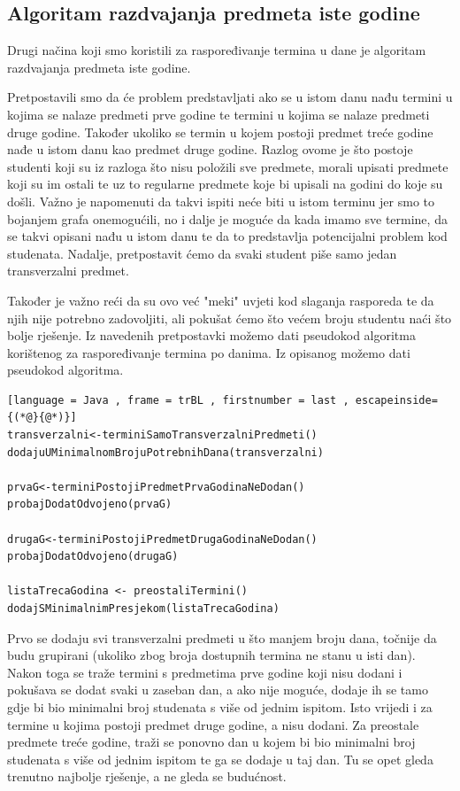 \documentclass[times, utf8, zavrsni, numeric]{fer}
\begin{document}
\subsection*{Algoritam razdvajanja predmeta iste godine}
Drugi načina koji smo koristili za raspoređivanje termina u dane je algoritam razdvajanja predmeta iste godine.\par
Pretpostavili smo da će problem predstavljati ako se u istom danu nađu termini u kojima se nalaze predmeti prve godine te termini u kojima se nalaze predmeti druge godine. Također ukoliko se termin u kojem postoji predmet treće godine nađe u istom danu kao predmet druge godine. Razlog ovome je što postoje studenti koji su iz razloga što nisu položili sve predmete, morali upisati predmete koji su im ostali te uz to regularne predmete koje bi upisali na godini do koje su došli. Važno je napomenuti da takvi ispiti neće biti u istom terminu jer smo to bojanjem grafa onemogućili, no i dalje je moguće da kada imamo sve termine, da se takvi opisani nađu u istom danu te da to predstavlja potencijalni problem kod studenata. Nadalje, pretpostavit ćemo da svaki student piše samo jedan transverzalni predmet.\par
Također je važno reći da su ovo već "meki" uvjeti kod slaganja rasporeda te da njih nije potrebno zadovoljiti, ali pokušat ćemo što većem broju studentu naći što bolje rješenje.
Iz navedenih pretpostavki možemo dati pseudokod algoritma korištenog za raspoređivanje termina po danima.
Iz opisanog možemo dati pseudokod algoritma.\par
\medskip
\begin{lstlisting}[language = Java , frame = trBL , firstnumber = last , escapeinside={(*@}{@*)}]
transverzalni<-terminiSamoTransverzalniPredmeti()
dodajuUMinimalnomBrojuPotrebnihDana(transverzalni)

prvaG<-terminiPostojiPredmetPrvaGodinaNeDodan()
probajDodatOdvojeno(prvaG)

drugaG<-terminiPostojiPredmetDrugaGodinaNeDodan()
probajDodatOdvojeno(drugaG)

listaTrecaGodina <- preostaliTermini()
dodajSMinimalnimPresjekom(listaTrecaGodina)	
\end{lstlisting}
\medskip
\par
Prvo se dodaju svi transverzalni predmeti u što manjem broju dana, točnije da budu grupirani (ukoliko zbog broja dostupnih termina ne stanu u isti dan). Nakon toga se traže termini s predmetima prve godine koji nisu dodani i pokušava se dodat svaki u zaseban dan, a ako nije moguće, dodaje ih se tamo gdje bi bio minimalni broj studenata s više od jednim ispitom. Isto vrijedi i za termine u kojima postoji predmet druge godine, a nisu dodani. Za preostale predmete treće godine, traži se ponovno dan u kojem bi bio minimalni broj studenata s više od jednim ispitom te ga se dodaje u taj dan. Tu se opet gleda trenutno najbolje rješenje, a ne gleda se budućnost.
\end{document}
